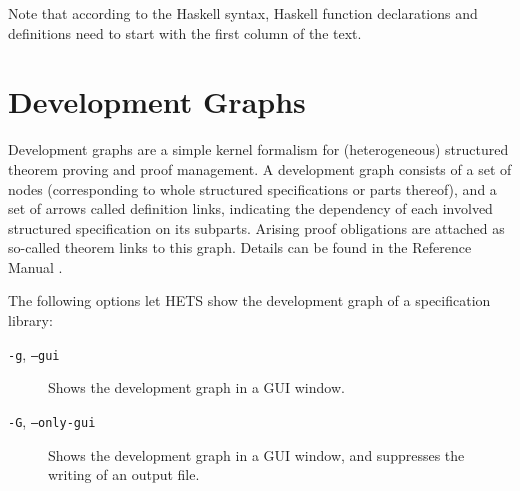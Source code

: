 \documentclass{article}
\newcommand{\normalTEXTSC}[2]{{#1\scriptsize#2}}
\newcommand     {\Hets}{\normalTEXTSC{H}{ETS}\xspace}
\begin{document}
Note that according to the Haskell syntax, Haskell function
declarations and definitions need to start with the first column of
the text.




\section{Development Graphs}\label{sec:DevGraph}

Development graphs are a simple kernel formalism for (heterogeneous)
structured theorem proving and proof management.  A development graph
consists of a set of nodes (corresponding to whole structured
specifications or parts thereof), and a set of arrows called
definition links, indicating the dependency of each involved
structured specification on its subparts.  Arising proof obligations
are attached as so-called theorem links to this graph.
Details can be found in the \CASL Reference Manual \cite[IV:4]{CASL/RefManual}.

The following options let \Hets show the development graph of
a specification library:
\begin{description}
\item[\texttt{-g}, \texttt{--gui}]  Shows the development graph in a GUI window.
\item[\texttt{-G}, \texttt{--only-gui}] Shows the development graph in a GUI window,
and suppresses the writing of an output file.
\end{description}
\end{document}
